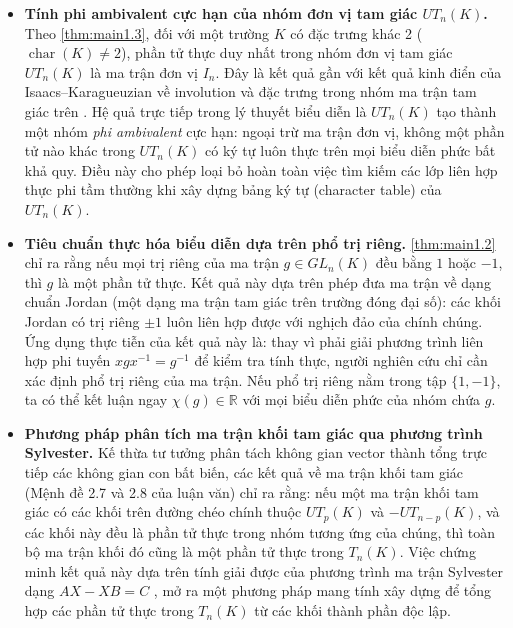 \begin{itemize}
    \item \textbf{Tính phi ambivalent cực hạn của nhóm đơn vị tam giác $UT_n(K)$.}
    Theo \cref{thm:main1.3}, đối với một trường $K$ có đặc trưng khác 2 ($\operatorname{char}(K) \neq 2$), phần tử thực duy nhất trong nhóm đơn vị tam giác $UT_n(K)$ là ma trận đơn vị $I_n$. Đây là kết quả gần với kết quả kinh điển của Isaacs--Karagueuzian về involution và đặc trưng trong nhóm ma trận tam giác trên \cite{IsaacsKaragueuzian2005}. Hệ quả trực tiếp trong lý thuyết biểu diễn là $UT_n(K)$ tạo thành một nhóm \textit{phi ambivalent} cực hạn: ngoại trừ ma trận đơn vị, không một phần tử nào khác trong $UT_n(K)$ có ký tự luôn thực trên mọi biểu diễn phức bất khả quy. Điều này cho phép loại bỏ hoàn toàn việc tìm kiếm các lớp liên hợp thực phi tầm thường khi xây dựng bảng ký tự (character table) của $UT_n(K)$.

    \item \textbf{Tiêu chuẩn thực hóa biểu diễn dựa trên phổ trị riêng.}
    \cref{thm:main1.2} chỉ ra rằng nếu mọi trị riêng của ma trận $g \in GL_n(K)$ đều bằng $1$ hoặc $-1$, thì $g$ là một phần tử thực. Kết quả này dựa trên phép đưa ma trận về dạng chuẩn Jordan (một dạng ma trận tam giác trên trường đóng đại số): các khối Jordan có trị riêng $\pm 1$ luôn liên hợp được với nghịch đảo của chính chúng. Ứng dụng thực tiễn của kết quả này là: thay vì phải giải phương trình liên hợp phi tuyến $xgx^{-1} = g^{-1}$ để kiểm tra tính thực, người nghiên cứu chỉ cần xác định phổ trị riêng của ma trận. Nếu phổ trị riêng nằm trong tập $\{1, -1\}$, ta có thể kết luận ngay $\chi(g) \in \mathbb{R}$ với mọi biểu diễn phức của nhóm chứa $g$.

    \item \textbf{Phương pháp phân tích ma trận khối tam giác qua phương trình Sylvester.}
    Kế thừa tư tưởng phân tách không gian vector thành tổng trực tiếp các không gian con bất biến, các kết quả về ma trận khối tam giác (Mệnh đề 2.7 và 2.8 của luận văn) chỉ ra rằng: nếu một ma trận khối tam giác có các khối trên đường chéo chính thuộc $UT_p(K)$ và $-UT_{n-p}(K)$, và các khối này đều là phần tử thực trong nhóm tương ứng của chúng, thì toàn bộ ma trận khối đó cũng là một phần tử thực trong $T_n(K)$. Việc chứng minh kết quả này dựa trên tính giải được của phương trình ma trận Sylvester dạng $AX - XB = C$ \cite{Roth1952,JiangWei2003}, mở ra một phương pháp mang tính xây dựng để tổng hợp các phần tử thực trong $T_n(K)$ từ các khối thành phần độc lập.
\end{itemize}

